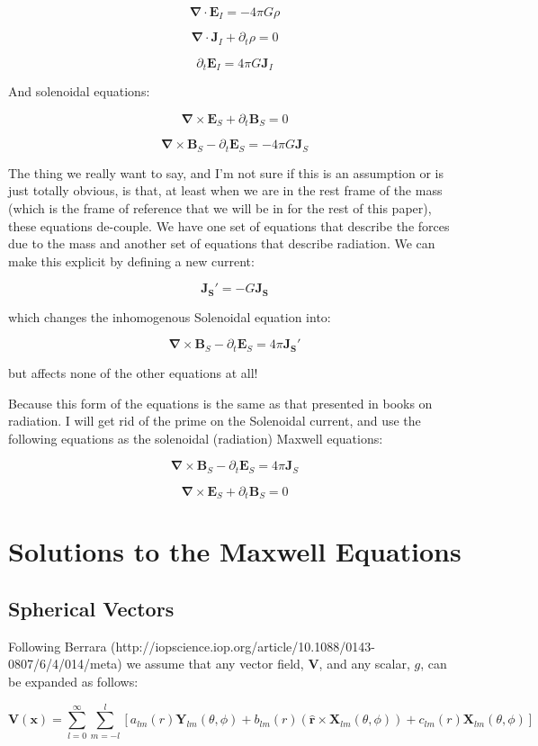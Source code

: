 \documentclass {article}
\renewcommand\vec{\mathbf}
\let\OldS\nabla
\renewcommand{\nabla}{\boldsymbol{\OldS}}
\let\OldHat\hat
\renewcommand{\hat}[1]{\OldHat{\mathbf{#1}}}
\begin{document}
$$\nabla \cdot \vec E_I = -4 \pi G  \rho$$

$$\nabla \cdot \vec J_I + \partial_t \rho = 0 $$

$$ \partial_t \vec E_I = 4 \pi G \vec J_I $$

And solenoidal equations:

$$\nabla \times \vec E_S + \partial_t \vec B_S = 0 $$

$$\nabla \times \vec B_S - \partial_t \vec E_S =  - 4 \pi G \vec J_S$$

The thing we really want to say, and I'm not sure if this is an assumption or is just totally obvious, is that, at least when we are in the rest frame of the mass (which is the frame of reference that we will be in for the rest of this paper), these equations de-couple. We have one set of equations that describe the forces due to the mass and another set of equations that describe radiation. We can make this explicit by defining a new current:

$$\vec {J_S'} = - G \vec {J_S}$$

which changes the inhomogenous Solenoidal equation into:

$$\nabla \times \vec B_S - \partial_t \vec E_S =  4 \pi \vec {J_S'} $$

but affects none of the other equations at all!

Because this form of the equations is the same as that presented in books on radiation. I will get rid of the prime on the Solenoidal current, and use the following equations as the solenoidal (radiation) Maxwell equations:

$$\nabla \times \vec B_S - \partial_t \vec E_S =  4 \pi \vec J_S$$

$$\nabla \times \vec E_S + \partial_t \vec B_S = 0 $$
\newpage

\section{Solutions to the Maxwell Equations}
\subsection{Spherical Vectors}
Following Berrara (http://iopscience.iop.org/article/10.1088/0143-0807/6/4/014/meta) we assume that any vector field, $\vec V$, and any scalar, $g$, can be expanded as follows:

$$\vec V (\vec x) = \sum_{l=0}^{\infty} \sum_{m=-l}^{l} \left[a_{lm}(r) \vec Y_{lm}(\theta, \phi) +b_{lm}(r) \left( \hat r \times \vec X_{lm} (\theta, \phi) \right) +c_{lm}(r) \vec X_{lm} (\theta, \phi) \right] $$
\end{document}
